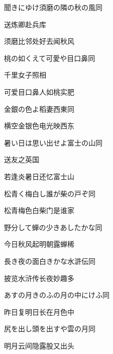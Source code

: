 \begin{haiku}
    {\FH 聞きにゆけ須磨の隣の秋の風}\hfill{\FH 同}

    {\FK 送炼卿赴兵库}

    {\FK 须磨比邻处好去闻秋风}
\end{haiku}

\begin{haiku}
    {\FH 桃の如くえて可愛や目口鼻}\hfill{\FH 同}

    {\FK 千里女子照相}

    {\FK 可爱目口鼻人如桃实肥}
\end{haiku}

\begin{haiku}
    {\FH 金銀の色よ稻妻西東}\hfill{\FH 同}

    {\FK 横空金银色电光映西东}
\end{haiku}

\begin{haiku}
    {\FH 暑い日は思い出せよ富士の山}\hfill{\FH 同}

    {\FK 送友之英国}

    {\FK 若逢炎暑日还忆富士山}
\end{haiku}

\begin{haiku}
    {\FH 松青く梅白し誰が柴の戸ぞ}\hfill{\FH 同}

    {\FK 松青梅色白柴门是谁家}
\end{haiku}

\begin{haiku}
    {\FH 野分して蝉の少きあしたかな}\hfill{\FH 同}

    {\FK 今日秋风起明朝露蝉稀}
\end{haiku}

\begin{haiku}
    {\FH 長き夜の面白きかな水滸伝}\hfill{\FH 同}

    {\FK 披览水浒传长夜妙趣多}
\end{haiku}

\begin{haiku}
    {\FH あすの月きのふの月の中にけふ}\hfill{\FH 同}

    {\FK 昨日复明日长在月色中}
\end{haiku}

\begin{haiku}
    {\FH 尻を出し頭を出すや雲の月}\hfill{\FH 同}

    {\FK 明月云间隐露股又出头}
\end{haiku}

